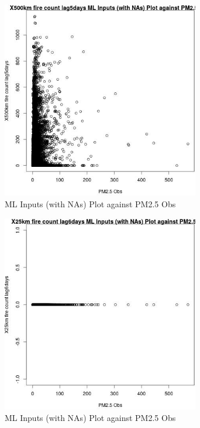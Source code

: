 \begin{figure} 
\centering  
\includegraphics[width=0.77\textwidth]{Code_Outputs/Report_ML_input_PM25_Step4_part_e_de_duplicated_aves_compiled_2019-05-14wNAs_X500km_fire_count_lag5daysvPM25_Obs.jpg} 
\caption{\label{fig:Report_ML_input_PM25_Step4_part_e_de_duplicated_aves_compiled_2019-05-14wNAsX500km_fire_count_lag5daysvPM25_Obs}ML Inputs (with NAs) Plot against PM2.5 Obs} 
\end{figure} 
 

\begin{figure} 
\centering  
\includegraphics[width=0.77\textwidth]{Code_Outputs/Report_ML_input_PM25_Step4_part_e_de_duplicated_aves_compiled_2019-05-14wNAs_X25km_fire_count_lag6daysvPM25_Obs.jpg} 
\caption{\label{fig:Report_ML_input_PM25_Step4_part_e_de_duplicated_aves_compiled_2019-05-14wNAsX25km_fire_count_lag6daysvPM25_Obs}ML Inputs (with NAs) Plot against PM2.5 Obs} 
\end{figure} 
 

